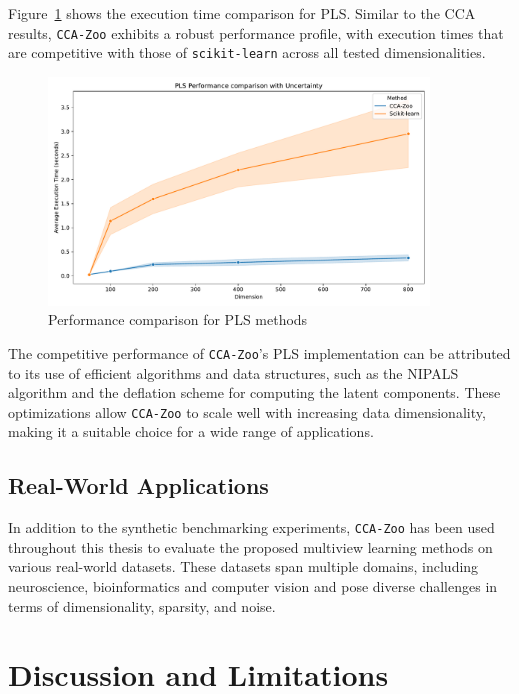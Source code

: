 Figure~\ref{fig:pls_benchmark} shows the execution time comparison for PLS. Similar to the CCA results, \texttt{CCA-Zoo} exhibits a robust performance profile, with execution times that are competitive with those of \texttt{scikit-learn} across all tested dimensionalities.

\begin{figure}[h]
\centering
\includegraphics[width=0.9\textwidth]{figures/PLS_Speed_Benchmark}
\caption{Performance comparison for PLS methods}
\label{fig:pls_benchmark}
\end{figure}

The competitive performance of \texttt{CCA-Zoo}'s PLS implementation can be attributed to its use of efficient algorithms and data structures, such as the NIPALS algorithm and the deflation scheme for computing the latent components. These optimizations allow \texttt{CCA-Zoo} to scale well with increasing data dimensionality, making it a suitable choice for a wide range of applications.

\subsection{Real-World Applications}

In addition to the synthetic benchmarking experiments, \texttt{CCA-Zoo} has been used throughout this thesis to evaluate the proposed multiview learning methods on various real-world datasets. These datasets span multiple domains, including neuroscience, bioinformatics and computer vision and pose diverse challenges in terms of dimensionality, sparsity, and noise.

\section{Discussion and Limitations}


